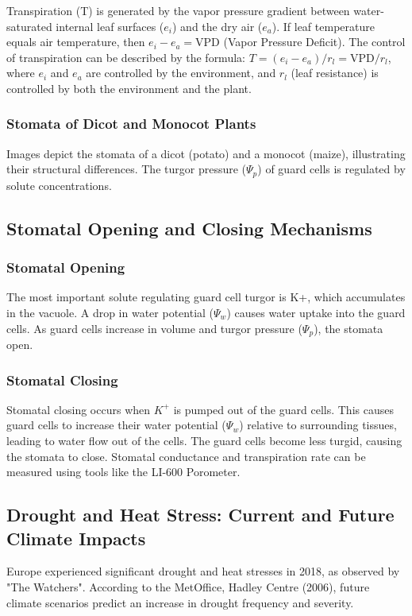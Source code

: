 \vspace*{1em}
Transpiration (T) is generated by the vapor pressure gradient between water-saturated internal leaf surfaces ($e_i$) and the dry air ($e_a$). If leaf temperature equals air temperature, then $e_i - e_a = \text{VPD}$ (Vapor Pressure Deficit). The control of transpiration can be described by the formula: $T = (e_i - e_a)/r_l = \text{VPD}/r_l$, where $e_i$ and $e_a$ are controlled by the environment, and $r_l$ (leaf resistance) is controlled by both the environment and the plant.

\subsubsection*{Stomata of Dicot and Monocot Plants} 
Images depict the stomata of a dicot (potato) and a monocot (maize), illustrating their structural differences. The turgor pressure ($\Psi_p$) of guard cells is regulated by solute concentrations.

\subsection{Stomatal Opening and Closing Mechanisms} 
\subsubsection*{Stomatal Opening} 
The most important solute regulating guard cell turgor is K+, which accumulates in the vacuole. A drop in water potential ($\Psi_w$) causes water uptake into the guard cells. As guard cells increase in volume and turgor pressure ($\Psi_p$), the stomata open.

\subsubsection*{Stomatal Closing} 
Stomatal closing occurs when $K^+$ is pumped out of the guard cells. This causes guard cells to increase their water potential ($\Psi_w$) relative to surrounding tissues, leading to water flow out of the cells. The guard cells become less turgid, causing the stomata to close.
Stomatal conductance and transpiration rate can be measured using tools like the LI-600 Porometer.

\subsection{Drought and Heat Stress: Current and Future Climate Impacts} 
Europe experienced significant drought and heat stresses in 2018, as observed by "The Watchers". According to the MetOffice, Hadley Centre (2006), future climate scenarios predict an increase in drought frequency and severity.

